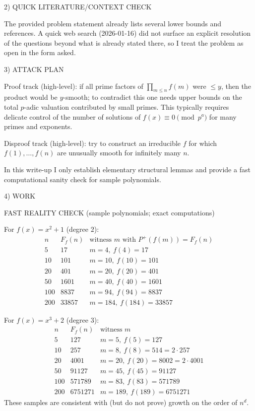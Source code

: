2) QUICK LITERATURE/CONTEXT CHECK

The provided problem statement already lists several lower bounds and references.
A quick web search (2026-01-16) did not surface an explicit resolution of the questions beyond what is already stated there, so I treat the problem as open in the form asked.

3) ATTACK PLAN

Proof track (high-level): if all prime factors of $\prod_{m\le n} f(m)$ were $\le y$, then the product would be $y$-smooth; to contradict this one needs upper bounds on the total $p$-adic valuation contributed by small primes. This typically requires delicate control of the number of solutions of $f(x)\equiv 0\pmod{p^a}$ for many primes and exponents.

Disproof track (high-level): try to construct an irreducible $f$ for which $f(1),\dots,f(n)$ are unusually smooth for infinitely many $n$.

In this write-up I only establish elementary structural lemmas and provide a fast computational sanity check for sample polynomials.

4) WORK

FAST REALITY CHECK (sample polynomials; exact computations)

For $f(x)=x^2+1$ (degree $2$):
\[
\begin{array}{c|c|c}
 n & F_f(n) & \text{witness }m\text{ with }P^+(f(m))=F_f(n)\\\hline
 5 & 17 & m=4,\ f(4)=17\\
 10 & 101 & m=10,\ f(10)=101\\
 20 & 401 & m=20,\ f(20)=401\\
 50 & 1601 & m=40,\ f(40)=1601\\
 100 & 8837 & m=94,\ f(94)=8837\\
 200 & 33857 & m=184,\ f(184)=33857
\end{array}
\]

For $f(x)=x^3+2$ (degree $3$):
\[
\begin{array}{c|c|c}
 n & F_f(n) & \text{witness }m\\\hline
 5 & 127 & m=5,\ f(5)=127\\
 10 & 257 & m=8,\ f(8)=514=2\cdot 257\\
 20 & 4001 & m=20,\ f(20)=8002=2\cdot 4001\\
 50 & 91127 & m=45,\ f(45)=91127\\
 100 & 571789 & m=83,\ f(83)=571789\\
 200 & 6751271 & m=189,\ f(189)=6751271
\end{array}
\]
These samples are consistent with (but do not prove) growth on the order of $n^d$.

